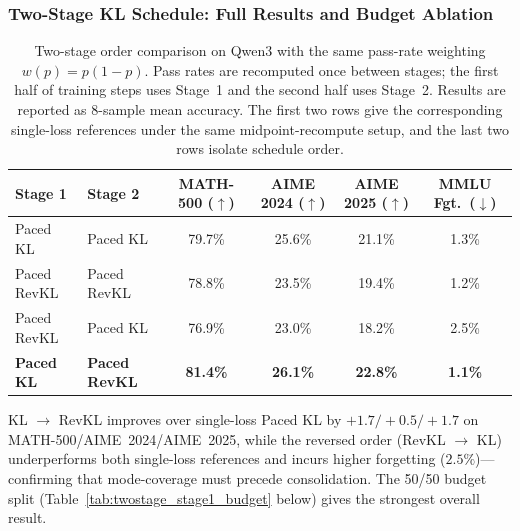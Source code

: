 \documentclass{article}
\newcommand{\mstd}[2]{#1\if\relax\detokenize{#2}\relax\else{$\scriptstyle\,\pm\,#2$}\fi\%}
\begin{document}
\subsubsection{Two-Stage KL Schedule: Full Results and Budget Ablation}
\label{app:twostage_budget}
\begin{table}[h]
\caption{Two-stage order comparison on Qwen3 with the same pass-rate weighting $w(p)=p(1-p)$. Pass rates are recomputed once between stages; the first half of training steps uses Stage~1 and the second half uses Stage~2. Results are reported as 8-sample mean accuracy. The first two rows give the corresponding single-loss references under the same midpoint-recompute setup, and the last two rows isolate schedule order.}
\centering
\begin{tabular}{ll|cccc}
\toprule
\textbf{Stage 1} & \textbf{Stage 2} & MATH-500 ($\uparrow$) & AIME 2024 ($\uparrow$) & AIME 2025 ($\uparrow$) & MMLU Fgt.\ ($\downarrow$) \\
\midrule
Paced KL & Paced KL & \mstd{79.7}{} & \mstd{25.6}{} & \mstd{21.1}{} & 1.3\% \\
Paced RevKL & Paced RevKL & \mstd{78.8}{} & \mstd{23.5}{} & \mstd{19.4}{} & 1.2\% \\
Paced RevKL & Paced KL & \mstd{76.9}{} & \mstd{23.0}{} & \mstd{18.2}{} & 2.5\% \\
\textbf{Paced KL} & \textbf{Paced RevKL} & \textbf{\mstd{81.4}{}} & \textbf{\mstd{26.1}{}} & \textbf{\mstd{22.8}{}} & \textbf{1.1\%} \\
\bottomrule
\end{tabular}
\label{tab:twostage_bridge}
\end{table}

KL $\rightarrow$ RevKL improves over single-loss Paced KL by $+1.7/+0.5/+1.7$ on MATH-500/AIME~2024/AIME~2025, while the reversed order (RevKL $\rightarrow$ KL) underperforms both single-loss references and incurs higher forgetting ($2.5\%$)---confirming that mode-coverage must precede consolidation. The 50/50 budget split (Table~\ref{tab:twostage_stage1_budget} below) gives the strongest overall result.
\end{document}
